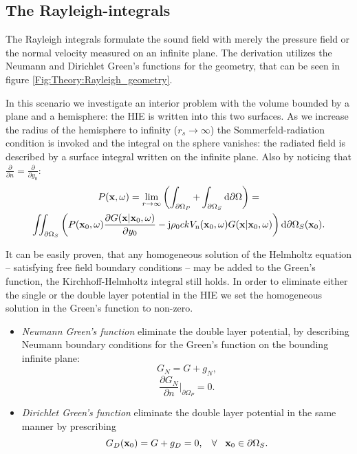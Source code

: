 \subsection{The Rayleigh-integrals}

The Rayleigh integrals formulate the sound field with merely the pressure field or the normal velocity measured on an infinite plane. The derivation utilizes the Neumann and Dirichlet Green's functions for the geometry, that can be seen in figure \ref{Fig:Theory:Rayleigh_geometry}.

In this scenario we investigate an interior problem with the volume bounded by a plane and a hemisphere: the HIE is written into this two surfaces. As we increase the radius of the hemisphere to infinity ($r_s \rightarrow \infty$) the Sommerfeld-radiation condition is invoked and the integral on the sphere vanishes: the radiated field is described by a surface integral written on the infinite plane. Also by noticing that $\frac{\partial}{\partial n} = \frac{\partial}{\partial y_0}$:
\begin{multline}
P(\mathbf{x},\omega) = \lim_{r\rightarrow \infty} \left( \int_{\partial \Omega_P} + \int_{\partial \Omega_S} \mathrm{d} \partial \Omega \right) = \\
\iint_{\partial \Omega_S}  \left( 
P(\mathbf{x}_0,\omega)  \frac{\partial G(\mathbf{x}|\mathbf{x}_0,\omega)}{\partial y_0}  -
\mathrm{j} \rho_0 c k V_{\mathrm{n}}(\mathbf{x}_0,\omega)  G(\mathbf{x}|\mathbf{x}_0,\omega) 
\right)   \mathrm{d} \partial \Omega_S ( \mathbf{x}_0).
\end{multline}

It can be easily proven, that any homogeneous solution of the Helmholtz equation -- satisfying free field boundary conditions -- may be added to the Green's function, the Kirchhoff-Helmholtz integral still holds. In order to eliminate either the single or the double layer potential in the HIE we set the homogeneous solution in the Green's function to non-zero.\begin{itemize}
\item \emph{Neumann Green's function} eliminate the double layer potential, by describing Neumann boundary conditions for the Green's function on the bounding infinite plane:
\begin{equation}
G_N = G + g_N,
\end{equation}
\begin{equation}
\frac{\partial G_N}{\partial n}|_{\partial \Omega_P} = 0.
\label{Eq:Theory:Neumann_Greenfun_def}
\end{equation}
\item \emph{Dirichlet Green's function} eliminate the double layer potential in the same manner by prescribing
\begin{equation}
G_D(\mathbf{x}_0) = G + g_D = 0, \hspace{3mm} \forall \hspace{3mm} \mathbf{x}_0 \in \partial \Omega_S.
\end{equation}
\end{itemize}

